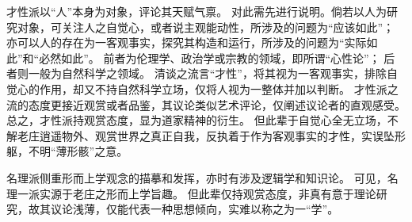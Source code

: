 \documentclass[11pt]{article}
\begin{document}
\newline

才性派以“人”本身为对象，评论其天赋气禀。
对此需先进行说明。倘若以人为研究对象，可关注人之自觉心，或者说主观能动性，所涉及的问题为“应该如此”；
亦可以人的存在为一客观事实，探究其构造和运行，所涉及的问题为“实际如此”和“必然如此”。
前者为伦理学、政治学或宗教的领域，即所谓“心性论”；
后者则一般为自然科学之领域。
清谈之流言“才性”，将其视为一客观事实，排除自觉心的作用，却又不持自然科学立场，仅将人视为一整体并加以判断。
才性派之流的态度更接近观赏或者品鉴，其议论类似艺术评论，仅阐述议论者的直观感受。
总之，才性派持观赏态度，显为道家精神的衍生。
但此辈于自觉心全无立场，不解老庄逍遥物外、观赏世界之真正自我，反执着于作为客观事实的才性，实误坠形躯，不明“薄形骸”之意。

\newline

名理派侧重形而上学观念的描摹和发挥，亦时有涉及逻辑学和知识论。
可见，名理一派实源于老庄之形而上学旨趣。
但此辈仅持观赏态度，非真有意于理论研究，故其议论浅薄，仅能代表一种思想倾向，实难以称之为一“学”。
\end{document}
